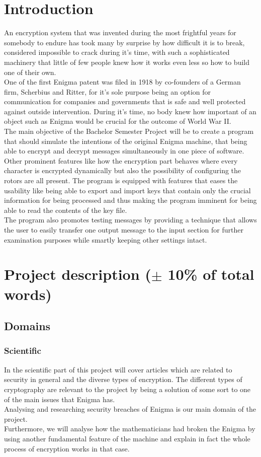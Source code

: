 \documentclass[conference,compsoc]{IEEEtran}
\begin{document}
\section{Introduction}
An encryption system that was invented during the most frightful years for somebody to endure has took many by surprise by how difficult it is to break, considered impossible to crack during it's time, with such a sophisticated machinery that little of few people knew how it works even less so how to build one of their own.\\
One of the first Enigma patent was filed in 1918 by co-founders of a German firm, Scherbius and Ritter, for it's sole purpose being an option for communication for companies and governments that is safe and well protected against outside intervention. During it's time, no body knew how important of an object such as Enigma would be crucial for the outcome of World War II.\\
The main objective of the Bachelor Semester Project will be to create a program that should simulate the intentions of the original Enigma machine, that being able to encrypt and decrypt messages simultaneously in one piece of software.
Other prominent features like how the encryption part behaves where every character is encrypted dynamically but also the possibility of configuring the rotors are all present. The program is equipped with features that eases the usability like being able to export and import keys that contain only the crucial information for being processed and thus making the program imminent for being able to read the contents of the key file.\\
The program also promotes testing messages by providing a technique that allows the user to easily transfer one output message to the input section for further examination purposes while smartly keeping other settings intact.\\


\section{Project description ($\pm$ 10\% of total words) }
\subsection{Domains}
\subsubsection{Scientific }
In the scientific part of this project will cover articles which are related to security in general and the diverse types of encryption. The different types of cryptography are relevant to the project by being a solution of some sort to one of the main issues that Enigma has.\\
Analysing and researching security breaches of Enigma is our main domain of the project.\\
Furthermore, we will analyse how the mathematicians had broken the Enigma by using another fundamental feature of the machine and explain in fact the whole process of encryption works in that case.\\
\end{document}
